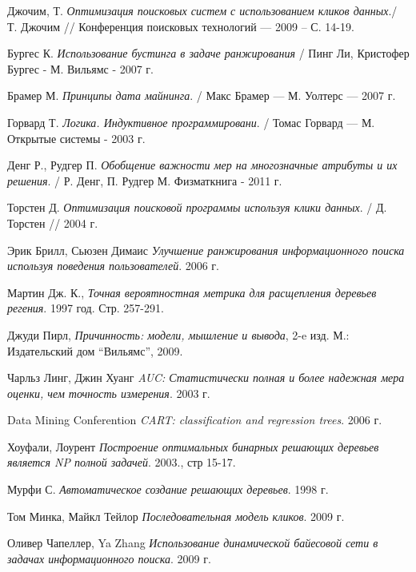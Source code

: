 \begin{thebibliography}{99}

   Джочим, Т.
  \emph{Оптимизация поисковых систем с использованием кликов данных}./ 
  Т. Джочим // Конференция поисковых технологий --- 2009 -- С. 14-19.

 Бургес К.
  \emph{Использование бустинга в задаче ранжирования} / Пинг Ли, Кристофер Бургес - М. Вильямс - 2007 г.

  Брамер М.
  \emph{Принципы дата майнинга}. / Макс Брамер --- М. Уолтерс ---  2007 г.

  Горвард Т.
  \emph{Логика. Индуктивное программировани}. / Томас Горвард --- М. Открытые системы - 2003 г.

  Денг Р., Рудгер П.
  \emph{Обобщение важности мер на многозначные атрибуты и их решения}. / Р. Денг, П. Рудгер  М. Физматкнига - 2011 г. 

  Торстен Д. 
  \emph{Оптимизация поисковой программы используя клики данных}. /
  Д. Торстен // 2004 г.

  Эрик Брилл, Сьюзен Димаис
  \emph{Улучшение ранжирования информационного поиска используя поведения пользователей}.
  2006 г.

  Мартин Дж. К.,
  \emph{Точная вероятностная метрика для расщепления деревьев регения}.
  1997 год. Стр. 257-291.

  Джуди Пирл,
  \emph{Причинность: модели, мышление и вывода}, 2-e изд.
  М.: Издательский дом ``Вильямс'',
  2009.

  Чарльз Линг, Джин Хуанг
  \emph{AUC: Статистически полная и более надежная мера оценки, чем точность измерения}.
  2003 г.

  Data Mining Conferention
  \emph{CART: classification and regression trees}.
  2006 г.

  Хоуфали, Лоурент
  \emph{Построение оптимальных бинарных решающих деревьев является NP полной задачей}.
  2003., стр 15-17.

  Мурфи С.
  \emph{Автоматическое создание решающих деревьев}.
  1998 г.

  Том Минка, Майкл Тейлор
  \emph{Последовательная модель кликов}.
  2009 г. 

  Оливер Чапеллер, Ya Zhang
  \emph{Использование динамической байесовой сети в задачах информационного поиска}.
  2009 г.


\end{thebibliography}
